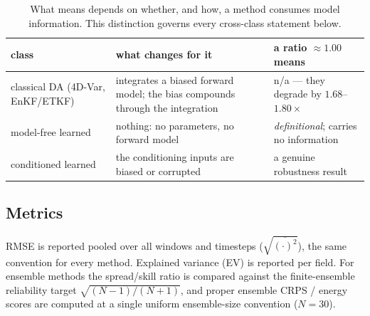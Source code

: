 \begin{table}[t]
\centering
\small
\begin{tabular}{@{}p{}p{}p{}@{}}
\toprule
\textbf{class} & \textbf{what \So{} changes for it} & \textbf{a ratio $\approx 1.00$ means} \\
\midrule
classical DA (4D-Var, EnKF/ETKF) & integrates a biased forward model; the bias
compounds through the integration & n/a --- they degrade by $1.68$--$1.80\times$ \\
model-free learned & nothing: no parameters, no forward model & \emph{definitional};
carries no information \\
conditioned learned & the conditioning inputs are biased or corrupted & a genuine
robustness result \\
\bottomrule
\end{tabular}
\caption{What \So{} means depends on whether, and how, a method consumes model
information. This distinction governs every cross-class statement below.}
\label{tab:classes}
\end{table}

\subsection{Metrics}
RMSE is reported pooled over all windows and timesteps
($\sqrt{\overline{(\cdot)^2}}$), the same convention for every method. Explained
variance (EV) is reported per field. For ensemble methods the spread/skill ratio
is compared against the finite-ensemble reliability target
$\sqrt{(N-1)/(N+1)}$, and proper ensemble CRPS / energy scores are computed at a
single uniform ensemble-size convention ($N=30$).

